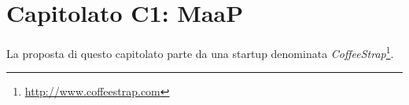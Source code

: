 \section{Capitolato C1: MaaP}
\label{capitolato1}
La proposta di questo capitolato parte da una startup denominata \textit{CoffeeStrap}\footnote{\url{http://www.coffeestrap.com}}.

